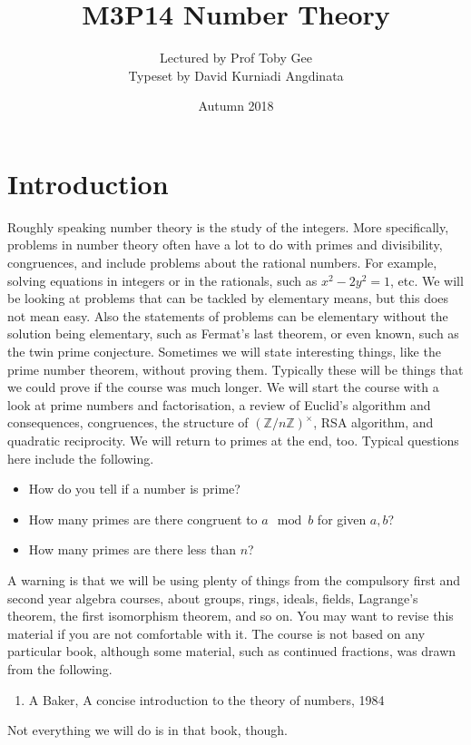 \documentclass{article}
\title{M3P14 Number Theory}
\author{Lectured by Prof Toby Gee \\ Typeset by David Kurniadi Angdinata}
\date{Autumn 2018}
\newcommand{\Z}{\mathbb{Z}}
\newcommand{\rb}[1]{\left( #1 \right)}
\newcommand{\unit}[1]{\rb{\Z / #1\Z}^\times}
\theoremstyle{definition}\newtheorem{definition}{Definition}
\theoremstyle{definition}\newtheorem{remark}[definition]{Remark}
\theoremstyle{definition}\newtheorem*{example}{Example}
\theoremstyle{definition}\newtheorem*{note}{Note}
\begin{document}
\maketitle

\vfill

\tableofcontents

\pagebreak


\section{Introduction}

Roughly speaking number theory is the study of the integers. More specifically, problems in number theory often have a lot to do with primes and divisibility, congruences, and include problems about the rational numbers. For example, solving equations in integers or in the rationals, such as $ x^2 - 2y^2 = 1 $, etc. We will be looking at problems that can be tackled by elementary means, but this does not mean easy. Also the statements of problems can be elementary without the solution being elementary, such as Fermat's last theorem, or even known, such as the twin prime conjecture. Sometimes we will state interesting things, like the prime number theorem, without proving them. Typically these will be things that we could prove if the course was much longer. We will start the course with a look at prime numbers and factorisation, a review of Euclid's algorithm and consequences, congruences, the structure of $ \unit{n} $, RSA algorithm, and quadratic reciprocity. We will return to primes at the end, too. Typical questions here include the following.
\begin{itemize}
\item How do you tell if a number is prime?
\item How many primes are there congruent to $ a \mod b $ for given $ a, b $?
\item How many primes are there less than $ n $?
\end{itemize}
A warning is that we will be using plenty of things from the compulsory first and second year algebra courses, about groups, rings, ideals, fields, Lagrange's theorem, the first isomorphism theorem, and so on. You may want to revise this material if you are not comfortable with it. The course is not based on any particular book, although some material, such as continued fractions, was drawn from the following.
\begin{enumerate}
\item A Baker, A concise introduction to the theory of numbers, 1984
\end{enumerate}
Not everything we will do is in that book, though.
\end{document}

